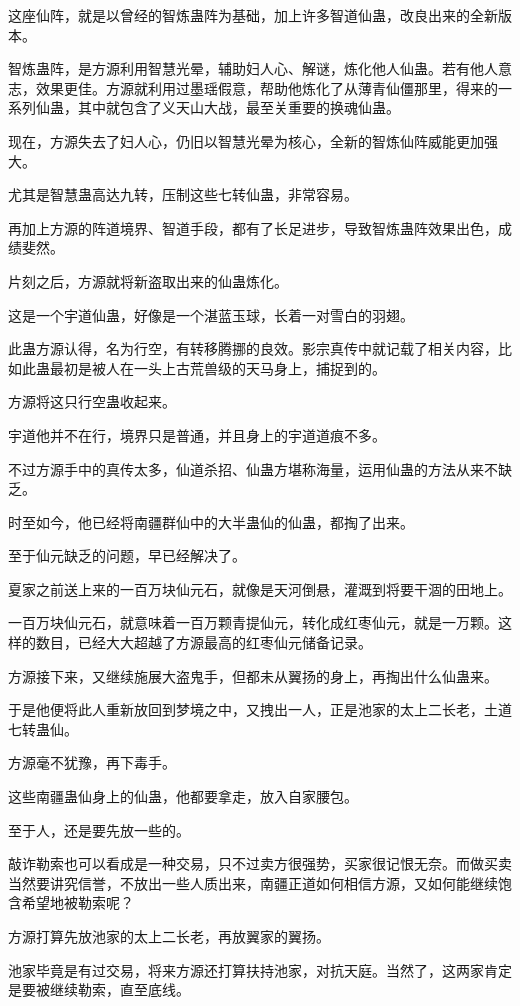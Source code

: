 \begin{this_body}
这座仙阵，就是以曾经的智炼蛊阵为基础，加上许多智道仙蛊，改良出来的全新版本。

智炼蛊阵，是方源利用智慧光晕，辅助妇人心、解谜，炼化他人仙蛊。若有他人意志，效果更佳。方源就利用过墨瑶假意，帮助他炼化了从薄青仙僵那里，得来的一系列仙蛊，其中就包含了义天山大战，最至关重要的换魂仙蛊。

现在，方源失去了妇人心，仍旧以智慧光晕为核心，全新的智炼仙阵威能更加强大。

尤其是智慧蛊高达九转，压制这些七转仙蛊，非常容易。

再加上方源的阵道境界、智道手段，都有了长足进步，导致智炼蛊阵效果出色，成绩斐然。

片刻之后，方源就将新盗取出来的仙蛊炼化。

这是一个宇道仙蛊，好像是一个湛蓝玉球，长着一对雪白的羽翅。

此蛊方源认得，名为行空，有转移腾挪的良效。影宗真传中就记载了相关内容，比如此蛊最初是被人在一头上古荒兽级的天马身上，捕捉到的。

方源将这只行空蛊收起来。

宇道他并不在行，境界只是普通，并且身上的宇道道痕不多。

不过方源手中的真传太多，仙道杀招、仙蛊方堪称海量，运用仙蛊的方法从来不缺乏。

时至如今，他已经将南疆群仙中的大半蛊仙的仙蛊，都掏了出来。

至于仙元缺乏的问题，早已经解决了。

夏家之前送上来的一百万块仙元石，就像是天河倒悬，灌溉到将要干涸的田地上。

一百万块仙元石，就意味着一百万颗青提仙元，转化成红枣仙元，就是一万颗。这样的数目，已经大大超越了方源最高的红枣仙元储备记录。

方源接下来，又继续施展大盗鬼手，但都未从翼扬的身上，再掏出什么仙蛊来。

于是他便将此人重新放回到梦境之中，又拽出一人，正是池家的太上二长老，土道七转蛊仙。

方源毫不犹豫，再下毒手。

这些南疆蛊仙身上的仙蛊，他都要拿走，放入自家腰包。

至于人，还是要先放一些的。

敲诈勒索也可以看成是一种交易，只不过卖方很强势，买家很记恨无奈。而做买卖当然要讲究信誉，不放出一些人质出来，南疆正道如何相信方源，又如何能继续饱含希望地被勒索呢？

方源打算先放池家的太上二长老，再放翼家的翼扬。

池家毕竟是有过交易，将来方源还打算扶持池家，对抗天庭。当然了，这两家肯定是要被继续勒索，直至底线。


\end{this_body}
